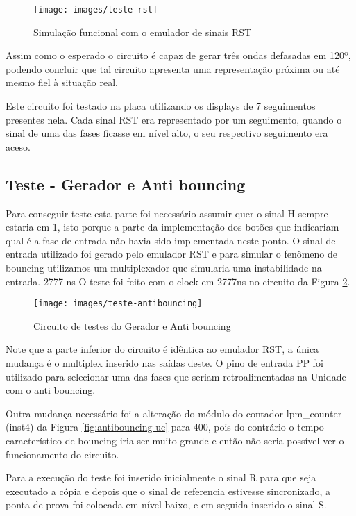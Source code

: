 \documentclass[12pt,a4paper,openany]{abntex2}
\begin{document}
\begin{figure}[!htp]
	\centering
	\caption{Simulação funcional com o emulador de sinais RST}
	\texttt{[image: images/teste-rst]}	\label{fig:teste-rst}
\end{figure}

Assim como o esperado o circuito é capaz de gerar três ondas defasadas em 120º, podendo concluir que tal circuito apresenta uma representação próxima ou até mesmo fiel à situação real.

Este circuito foi testado na placa utilizando os displays de 7 seguimentos presentes nela. Cada sinal RST era representado por um seguimento, quando o sinal de uma das fases ficasse em nível alto, o seu respectivo seguimento era aceso. 

\subsection{Teste - Gerador e Anti bouncing}

Para conseguir teste esta parte foi necessário assumir quer o sinal H sempre estaria em 1, isto porque a parte da implementação dos botões que indicariam qual é a fase de entrada não havia sido implementada neste ponto. O sinal de entrada utilizado foi gerado pelo emulador RST e para simular o fenômeno de bouncing utilizamos um multiplexador que simularia uma instabilidade na entrada.
2777 ns
O teste foi feito com o clock em 2777ns no circuito da Figura \ref{fig:teste-antibouncing}.

\begin{figure}[!htp]
	\centering
	\caption{Circuito de testes do Gerador e Anti bouncing}
	\texttt{[image: images/teste-antibouncing]}	\label{fig:teste-antibouncing}
\end{figure}

Note que a parte inferior do circuito é idêntica ao emulador RST, a única mudança é o multiplex inserido nas saídas deste. O pino de entrada PP foi utilizado para selecionar uma das fases que seriam retroalimentadas na Unidade com o anti bouncing.

Outra mudança necessário foi a alteração do módulo do contador lpm\_counter (inst4) da Figura \ref{fig:antibouncing-uc} para 400, pois do contrário o tempo característico de bouncing iria ser muito grande e então não seria possível ver o funcionamento do circuito.

Para a execução do teste foi inserido inicialmente o sinal R para que seja executado a cópia e depois que o sinal de referencia estivesse sincronizado, a ponta de prova foi colocada em nível baixo, e em seguida inserido o sinal S.
\end{document}
